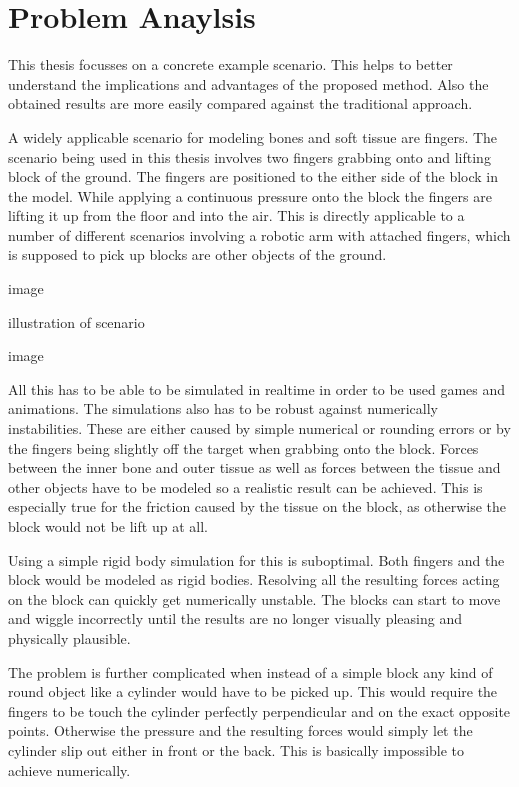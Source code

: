 \chapter{Problem Anaylsis}
\label{cha:problem_anaylsis}

This thesis focusses on a concrete example scenario. This helps to better understand the implications and advantages of the proposed method. Also the obtained results are more easily compared against the traditional approach.

A widely applicable scenario for modeling bones and soft tissue are fingers. The scenario being used in this thesis involves two fingers grabbing onto and lifting block of the ground. The fingers are positioned to the either side of the block in the model. While applying a continuous pressure onto the block the fingers are lifting it up from the floor and into the air. This is directly applicable to a number of different scenarios involving a robotic arm with attached fingers, which is supposed to pick up blocks are other objects of the ground.

image

illustration of scenario

image


All this has to be able to be simulated in realtime in order to be used games and animations. The simulations also has to be robust against numerically instabilities. These are either caused by simple numerical or rounding errors or by the fingers being slightly off the target when grabbing onto the block. Forces between the inner bone and outer tissue as well as forces between the tissue and other objects have to be modeled so a realistic result can be achieved. This is especially true for the friction caused by the tissue on the block, as otherwise the block would not be lift up at all.

Using a simple rigid body simulation for this is suboptimal. Both fingers and the block would be modeled as rigid bodies. Resolving all the resulting forces acting on the block can quickly get numerically unstable. The blocks can start to move and wiggle incorrectly until the results are no longer visually pleasing and physically plausible.

The problem is further complicated when instead of a simple block any kind of round object like a cylinder would have to be picked up. This would require the fingers to be touch the cylinder perfectly perpendicular and on the exact opposite points. Otherwise the pressure and the resulting forces would simply let the cylinder slip out either in front or the back. This is basically impossible to achieve numerically.

